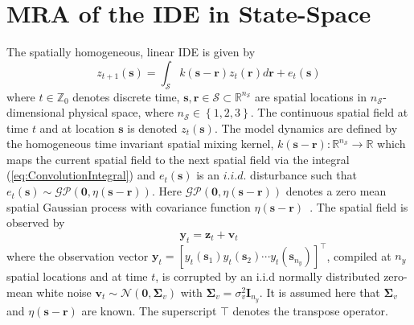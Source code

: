 \documentclass[11pt,draftcls,onecolumn,peerreview]{IEEEtran}
\begin{document}
\section{MRA of the IDE in State-Space}
The spatially homogeneous, linear IDE is given by
\begin{equation}
 z_{t+1}\left(\mathbf{s}\right)=\int_{\mathcal{S}}k\left(\mathbf{s}-\mathbf{r}\right)z_{t}\left(\mathbf{r}\right)d\mathbf{r}+e_{t}\left(\mathbf{s}\right)
\label{eq:ConvolutionIntegral}
\end{equation}
where $t\in \mathbb{Z}_0 $ denotes discrete time, $\mathbf{s},\mathbf{r} \in \mathcal{S} \subset \mathbb{R}^{n_\mathcal{S}}$ are spatial locations in $n_{\mathcal S}$-dimensional physical space, where $n_{\mathcal S} \in \left\lbrace 1,2,3 \right\rbrace $. The continuous spatial field at time $t$ and at location $\mathbf s$ is denoted $z_t\left(\mathbf s\right)$. The model dynamics  are defined by the homogeneous time invariant spatial mixing kernel, $k\left(\mathbf{s}-\mathbf{r}\right):\mathbb{R}^{n_\mathcal{S}}\rightarrow \mathbb{R}$ which maps the current spatial field to the next spatial field via the integral (\ref{eq:ConvolutionIntegral}) and $e_t(\mathbf s)$ is an $i.i.d.$ disturbance such that $e_t(\mathbf{s})\sim\mathcal{GP}(\mathbf 0,\eta(\mathbf{s}-\mathbf{r}))$.  Here $\mathcal{GP}(\mathbf 0,\eta(\mathbf{s}-\mathbf{r}))$  denotes a zero mean spatial Gaussian process with covariance function $\eta(\mathbf{s}-\mathbf{r})$~\cite{Rasmussen2005}. The spatial field is observed by
\begin{equation}
 \mathbf{y}_{t}=\mathbf{z}_{t}+\mathbf{v}_t
\label{eq:observation equation}
\end{equation}
where the observation vector $\mathbf{y}_{t}=[y_t(\mathbf{s}_1) y_t(\mathbf{s}_2)\cdots y_t(\mathbf{s}_{n_y})]^\top$, compiled at $n_{y}$ spatial locations and at time $t$, is corrupted by an i.i.d normally distributed zero-mean white noise $\mathbf{v}_{t}\sim \mathcal{N}\left(\mathbf{0},\mathbf{\Sigma}_{v}\right)$ with $\mathbf{\Sigma}_{v}=\sigma_v^2\mathbf I_{n_y} $. It is assumed here that $\boldsymbol\Sigma_v$ and $\eta\left(\mathbf s-\mathbf r \right)$ are known. The superscript $\top$ denotes the transpose operator.
\end{document}
